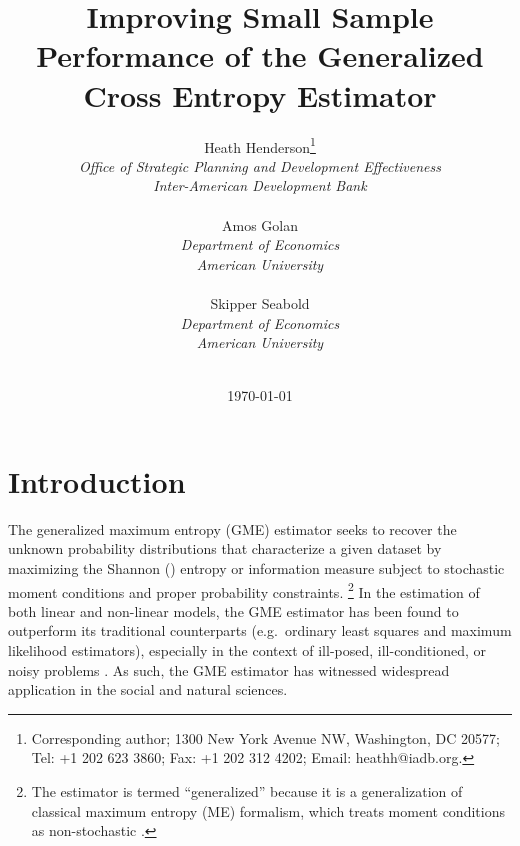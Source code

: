 \documentclass[english]{article}
\title{Improving Small Sample Performance of the Generalized Cross 
Entropy Estimator}
\author{
Heath Henderson\thanks{Corresponding author; 1300 New York Avenue 
NW, Washington, DC 20577; Tel: +1 202 623 3860; Fax: +1 202 312 4202; 
Email: heathh@iadb.org.}\\
\textit{Office of Strategic Planning and Development Effectiveness} \\
\textit{Inter-American Development Bank} \\
\\
Amos Golan \\
\textit{Department of Economics}\\
\textit{American University} \\
\\
Skipper Seabold \\
\textit{Department of Economics}\\
\textit{American University}
\\ \\
}
\date{\today}
\begin{document}

\begin{titlepage}
\maketitle

\thispagestyle{empty}
\end{titlepage}
\newpage


\doublespacing


\section{Introduction}
\label{sec: intro}

The generalized maximum entropy (GME) estimator seeks to recover the 
unknown probability distributions that characterize a given dataset by 
maximizing the Shannon (\citeyear{shannon1948}) entropy or information 
measure subject to stochastic moment conditions and proper probability 
constraints.%
\footnote{The estimator is termed ``generalized'' because it is a 
generalization of classical maximum entropy (ME) formalism, which treats
moment conditions as non-stochastic \citep{jaynes1957a, jaynes1957b}.}
In the estimation of both linear and non-linear models, the GME estimator
has been found to outperform its traditional counterparts (e.g.\ ordinary 
least squares and maximum likelihood estimators), especially in the context 
of ill-posed, ill-conditioned, or noisy problems \citep{golan1996}.
As such, the GME estimator has witnessed widespread application in the 
social and natural sciences.
\end{document}
